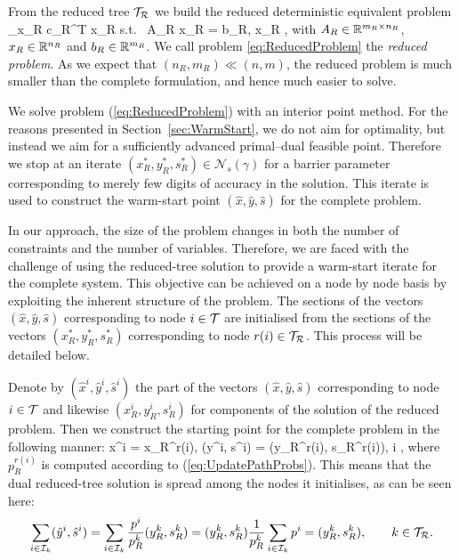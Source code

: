 From the reduced tree $\mathcal{T}_\mathcal{R}$ 
we build the reduced deterministic 
equivalent problem
\be \label{eq:ReducedProblem}
\min_{x_R}\; c_R^T x_R \;\quad \mbox{s.t. }\; A_R x_R = b_R, \; x_R ,
\ee
with $A_R \in \mathbb{R}^{m_R\times n_R}$, $x_R \in 
\mathbb{R}^{n_R}$ and $b_R \in \mathbb{R}^{m_R}$. 
We call problem \eqref{eq:ReducedProblem} the {\em reduced problem}.
As we expect that $(n_R, m_R) \ll (n, m)$, the reduced problem is 
much smaller than the complete formulation, and hence much easier to solve.

We solve problem (\ref{eq:ReducedProblem}) with an interior point method. 
For the reasons presented in Section~\ref{sec:WarmStart}, we do not 
aim for optimality, but instead we aim for a sufficiently advanced 
primal--dual feasible point. Therefore we stop at an iterate
$(x_R^*,y_R^*,s_R^*)\in\mathcal{N}_s(\gamma)$ for a
barrier parameter corresponding to merely few digits of accuracy 
in the solution.
This iterate is used to construct the warm-start point
$(\hat{x}, \hat{y}, \hat{s})$ for the complete problem.

In our approach, the size of the problem changes in both 
the number of constraints and the number of variables.
Therefore, we are faced with the challenge of using 
the reduced-tree solution to provide a warm-start iterate for 
the complete system.
This objective can be achieved on a node by node basis 
by exploiting the inherent structure of the problem.
The sections of the vectors
$(\hat{x}, \hat{y}, \hat{s})$ corresponding to node $i\in\mathcal{T}$ are
initialised from the sections of the vectors 
$(x_R^*,y_R^*,s_R^*)$ corresponding to node $r(i)\in\mathcal{T}_\mathcal{R}$. This process
will be detailed below.

Denote by $(\hat x^{i}, \hat y^{i}, \hat s^{i})$ the part of the vectors
$(\hat{x}, \hat{y}, \hat{s})$ corresponding to node $i\in\mathcal{T}$ and likewise
$(x_R^{i}, y_R^{i},  s_R^{i})$ for components of the solution of the
reduced problem. Then we construct the starting point for the complete
problem in the following manner:
\be  \label{eq:WarmstartSolution}
  \hat x^{i} = x_R^{r(i)}, \qquad 
 (\hat y^{i}, \hat s^{i}) =  (y_R^{r(i)}, s_R^{r(i)}),
  \qquad i \in \Ctree,
\ee
where $p^{r(i)}_R$ is computed according to (\ref{eq:UpdatePathProbs}).
This means that the dual reduced-tree solution is spread among the
nodes it initialises, as can be seen here:
\[
   \sum_{i \in \mathcal{I}_k} (\hat y^i, \hat s^i)
  = \sum_{i \in \mathcal{I}_k} \frac{p^i}{p^k_R} (y^k_R, s^k_R)
  = (y^k_R, s^k_R) \frac{1}{p^k_R} \sum_{i \in \mathcal{I}_k} p^i 
  = (y^k_R, s^k_R), \qquad k \in \mathcal{T}_\mathcal{R}.
\]

